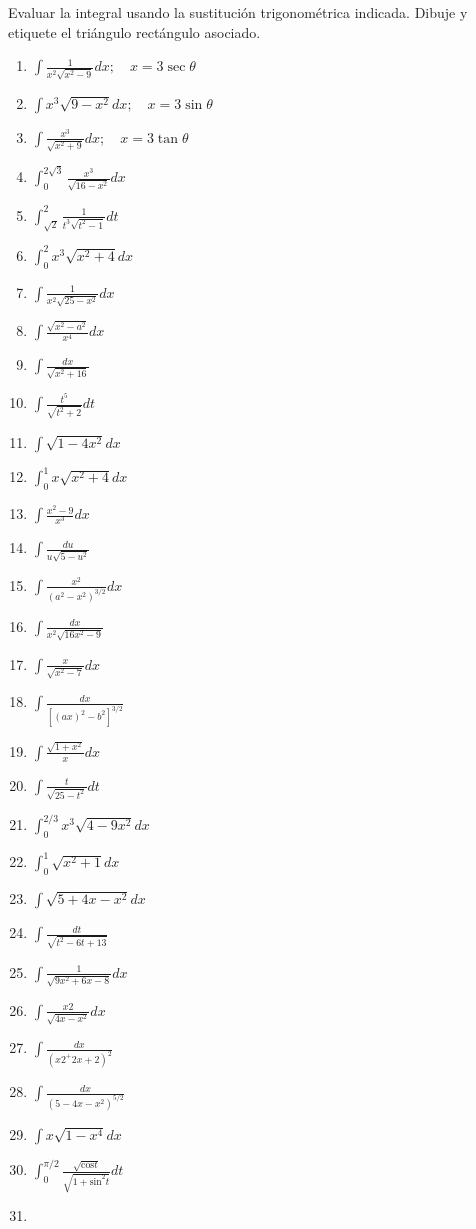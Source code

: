 \documentclass[12pt,]{article}
\begin{document}
Evaluar la integral usando la sustitución trigonométrica indicada.
Dibuje y etiquete el triángulo rectángulo asociado.

\begin{enumerate}
\def\labelenumi{\arabic{enumi}.}
\item
  \(\displaystyle\int\frac{1}{x^2\sqrt{x^2-9}}dx;\quad x=3\sec \theta\)
\item
  \(\displaystyle\int x^3\sqrt{9-x^2}dx;\quad x=3\sin\theta\)
\item
  \(\displaystyle\int\frac{x^3}{\sqrt{x^2+9}}dx;\quad x=3\tan\theta\)
\item
  \(\displaystyle\int_0^{2\sqrt{3}}\frac{x^3}{\sqrt{16-x^2}}dx\)
\item
  \(\displaystyle\int_{\sqrt{2}}^2\frac{1}{t^3\sqrt{t^2-1}}dt\)
\item
  \(\displaystyle\int_0^2x^3\sqrt{x^2+4}dx\)
\item
  \(\displaystyle\int\frac{1}{x^2\sqrt{25-x^2}}dx\)
\item
  \(\displaystyle\int\frac{\sqrt{x^2-a^2}}{x^4}dx\)
\item
  \(\displaystyle\int\frac{dx}{\sqrt{x^2+16}}\)
\item
  \(\displaystyle\int\frac{t^5}{\sqrt{t^2+2}}dt\)
\item
  \(\displaystyle\int\sqrt{1-4x^2}dx\)
\item
  \(\displaystyle\int_0^1 x\sqrt{x^2+4}dx\)
\item
  \(\displaystyle\int\frac{x^2-9}{x^3}dx\)
\item
  \(\displaystyle\int\frac{du}{u\sqrt{5-u^2}}\)
\item
  \(\displaystyle\int\frac{x^2}{(a^2-x^2)^{3/2}}dx\)
\item
  \(\displaystyle\int\frac{dx}{x^2\sqrt{16x^2-9}}\)
\item
  \(\displaystyle\int\frac{x}{\sqrt{x^2-7}}dx\)
\item
  \(\displaystyle\int\frac{dx}{[(ax)^2-b^2]^{3/2}}\)
\item
  \(\displaystyle\int\frac{\sqrt{1+x^2}}{x}dx\)
\item
  \(\displaystyle\int\frac{t}{\sqrt{25-t^2}}dt\)
\item
  \(\displaystyle\int_0^{2/3}x^3\sqrt{4-9x^2}dx\)
\item
  \(\displaystyle\int_0^1\sqrt{x^2+1}dx\)
\item
  \(\displaystyle\int\sqrt{5+4x-x^2}dx\)
\item
  \(\displaystyle\int\frac{dt}{\sqrt{t^2-6t+13}}\)
\item
  \(\displaystyle\int\frac{1}{\sqrt{9x^2+6x-8}}dx\)
\item
  \(\displaystyle\int\frac{x2}{\sqrt{4x-x^2}}dx\)
\item
  \(\displaystyle\int\frac{dx}{(x2^+2x+2)^2}\)
\item
  \(\displaystyle\int\frac{dx}{(5-4x-x^2)^{5/2}}\)
\item
  \(\displaystyle\int x\sqrt{1-x^4}dx\)
\item
  \(\displaystyle\int_0^{\pi/2}\frac{\sqrt{\text{cos}t}}{\sqrt{1+\text{sin}^2t}}dt\)
\item
\end{enumerate}
\end{document}
